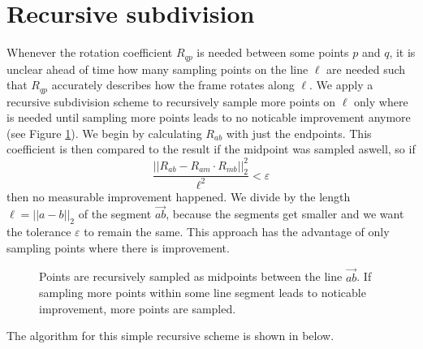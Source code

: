\documentclass[../thesis.tex]{subfiles}
\begin{document}
\section{Recursive subdivision}
Whenever the rotation coefficient $R_{qp}$ is needed between some points $p$ and $q$,
it is unclear ahead of time how many sampling points on the line $\ell$
are needed such that $R_{qp}$ accurately describes how the frame rotates along $\ell$.
We apply a recursive subdivision scheme to recursively sample more points on $\ell$ only where is needed
until sampling more points leads to no noticable improvement anymore (see Figure \ref{fig:recursiveSubdivision}).
We begin by calculating $R_{ab}$ with just the endpoints. This coefficient is then compared to the result if the midpoint was sampled aswell,
so if
$$\frac{||R_{ab} - R_{am}\cdot R_{mb}||^2_2}{\ell^2}< \varepsilon$$
then no measurable improvement happened. We divide by the length $\ell = ||a-b||_2$ of the segment $\vec{ab}$, because the segments get smaller
and we want the tolerance $\varepsilon$ to remain the same.
This approach has the advantage of only sampling points where there is improvement.
\begin{figure}[htb]
  \centering
  \def\svgwidth{20em}
  
  \caption{Points are recursively sampled as midpoints between the line $\vec{ab}$.
  If sampling more points within some line segment leads to noticable improvement, more points are sampled.}
  \label{fig:recursiveSubdivision}
\end{figure}
The algorithm for this simple recursive scheme is shown in below.
\end{document}
